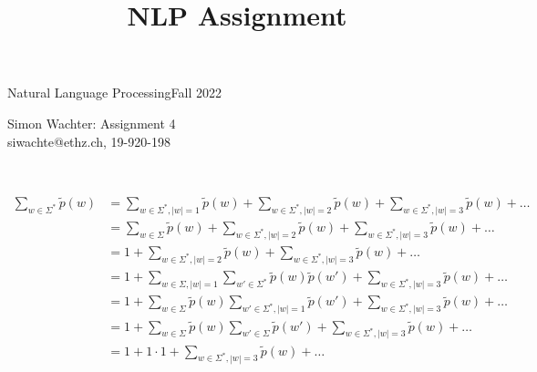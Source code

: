 \documentclass[a4paper,12pt]{ETHexercise}
\title{NLP Assignment}
\begin{document}


\newcommand{\pair}[2]{{\langle #1 , #2 \rangle}}
\newcommand{\score}[2]{\text{score}_{\theta}(\langle #1, #2 \rangle, \boldsymbol{w})}
\newcommand{\sscore}[1]{\text{score}_{\theta}(#1, \boldsymbol{w})}
\newcommand*{\eos}{\text{EOS}}

{}
{\Large Natural Language Processing}{Fall 2022}
\begin{center}
	{\Huge Simon Wachter: Assignment 4}\\
	\quad\newline
	siwachte@ethz.ch, 19-920-198\\
	\quad\newline
	\timestamp
\end{center}
\begin{question}\\
	\begin{subquestion}
		\begin{align}
			\sum_{w \in \Sigma^*} \tilde{p}(w) & = \sum_{w \in \Sigma^*, |w|=1} \tilde{p}(w) + \sum_{w \in \Sigma^*, |w|=2} \tilde{p}(w) + \sum_{w \in \Sigma^*, |w|=3} \tilde{p}(w) + \dots                      \\
			                                   & = \sum_{w \in \Sigma} \tilde{p}(w) + \sum_{w \in \Sigma^*, |w|=2} \tilde{p}(w) + \sum_{w \in \Sigma^*, |w|=3} \tilde{p}(w) + \dots                               \\
			                                   & = 1 + \sum_{w \in \Sigma^*, |w|=2} \tilde{p}(w) + \sum_{w \in \Sigma^*, |w|=3} \tilde{p}(w) + \dots                                                              \\
			                                   & = 1 + \sum_{w \in \Sigma, |w|=1} \sum_{w' \in \Sigma^*} \tilde{p}(w) \tilde{p}(w') + \sum_{w \in \Sigma^*, |w|=3} \tilde{p}(w) + \dots                           \\
			                                   & = 1 + \sum_{w \in \Sigma} \tilde{p}(w) \sum_{w' \in \Sigma^*, |w|=1} \tilde{p}(w') + \sum_{w \in \Sigma^*, |w|=3} \tilde{p}(w) + \dots                           \\
			                                   & = 1 + \sum_{w \in \Sigma} \tilde{p}(w) \sum_{w' \in \Sigma} \tilde{p}(w') + \sum_{w \in \Sigma^*, |w|=3} \tilde{p}(w) + \dots                                    \\
			                                   & = 1 + 1 \cdot 1 + \sum_{w \in \Sigma^*, |w|=3} \tilde{p}(w) + \dots                                                                                              \\

\end{align}
\end{subquestion}
\end{question}
\end{document}

